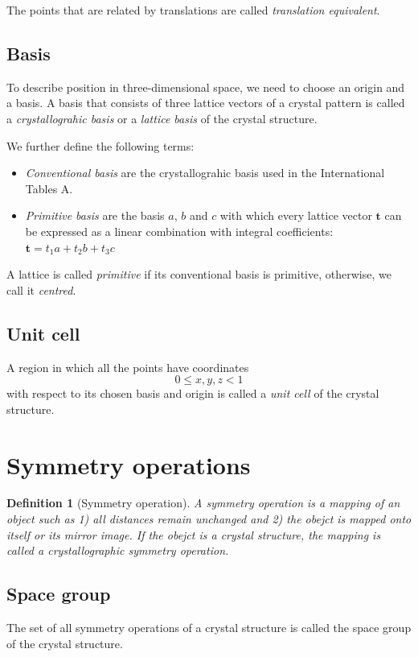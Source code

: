 \documentclass{amsart}
\newcommand{\bft}{\mathbf{t}}
\newtheorem{definition}{Definition}
\begin{document}
The points that are related by translations are called \emph{translation equivalent}.

\vspace{10pt}

\subsection*{Basis}
To describe position in three-dimensional space, we need to choose an origin and a basis. 
A basis that consists of three lattice vectors of a crystal pattern is called a \emph{crystallograhic basis}
or a \emph{lattice basis} of the crystal structure. 

We further define the following terms:
\begin{itemize}
    \item \emph{Conventional basis} are the crystallograhic basis used in the International Tables A.
    \item \emph{Primitive basis} are the basis $a$, $b$ and $c$ with which every lattice vector $\bft$ can be expressed 
            as a linear combination with integral coefficients: $\bft = t_1 a + t_2 b + t_3 c$
\end{itemize}
A lattice is called \emph{primitive} if its conventional basis is primitive,  otherwise, we call it \emph{centred}. 

\subsection*{Unit cell}
A region in which all the points have coordinates \[0 \leq x,y,z < 1\]
with respect to its chosen basis and origin is called a \emph{unit cell} of the crystal structure.

\vspace{10pt}

\section*{Symmetry operations}
\begin{definition}
    [Symmetry operation]
    A symmetry operation is a mapping of an object such as 1) all distances remain unchanged and 2) the obejct is mapped onto itself or its mirror image.
    If the obejct is a crystal structure, the mapping is called a \emph{crystallographic symmetry operation}.
\end{definition}

\subsection*{Space group}
The set of all symmetry operations of a crystal structure is called the space group of the crystal structure.
\end{document}
